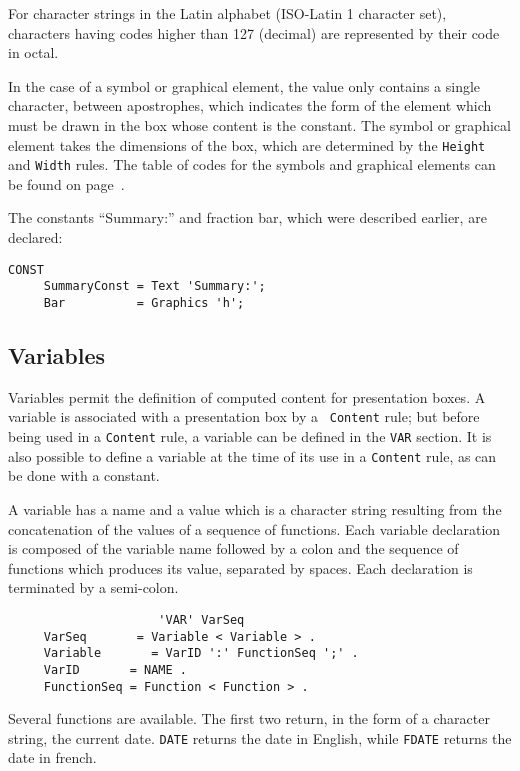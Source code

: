 For character strings in the Latin alphabet (ISO-Latin 1 character
set), characters having codes higher than 127 (decimal) are
represented by their code in octal.

In the case of a symbol or graphical element, the value only contains
a single character, between apostrophes, which indicates the form of
the element which must be drawn in the box whose content is the
constant.  The symbol or graphical element takes the dimensions of the
box, which are determined by the {\tt Height} and {\tt Width} rules.
The table of codes for the symbols and graphical elements can be found
on page~\pageref{codesymbole}.

\begin{example}
The constants ``Summary:'' and fraction bar, which were described
earlier, are declared:

\begin{verbatim}
CONST
     SummaryConst = Text 'Summary:';
     Bar          = Graphics 'h';
\end{verbatim}
\end{example}

\subsection{Variables}
\label{variables}

Variables permit the definition of computed content for presentation
boxes.  A variable is associated with a presentation box by a {\tt
Content} rule; but before being used in a {\tt Content} rule, a
variable can be defined in the {\tt VAR} section.  It is also possible
to define a variable at the time of its use in a {\tt Content} rule,
as can be done with a constant.

A variable has a name and a value which is a character string
resulting from the concatenation of the values of a sequence of
functions.  Each variable declaration is composed of the variable name
followed by a colon and the sequence of functions which produces its
value, separated by spaces.  Each declaration is terminated by a
semi-colon.

\begin{verbatim}
                     'VAR' VarSeq
     VarSeq       = Variable < Variable > .
     Variable       = VarID ':' FunctionSeq ';' .
     VarID       = NAME .
     FunctionSeq = Function < Function > .
\end{verbatim}

Several functions are available.  The first two return, in the form of a
character string, the current date.  {\tt DATE} returns the date in
English, while {\tt FDATE} returns the date in french.


